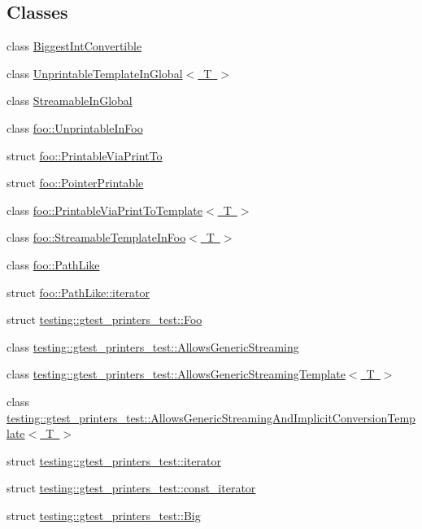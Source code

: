 \subsection*{Classes}
\begin{DoxyCompactItemize}
\item 
class \mbox{\hyperlink{class_biggest_int_convertible}{Biggest\+Int\+Convertible}}
\item 
class \mbox{\hyperlink{class_unprintable_template_in_global}{Unprintable\+Template\+In\+Global$<$ T $>$}}
\item 
class \mbox{\hyperlink{class_streamable_in_global}{Streamable\+In\+Global}}
\item 
class \mbox{\hyperlink{classfoo_1_1_unprintable_in_foo}{foo\+::\+Unprintable\+In\+Foo}}
\item 
struct \mbox{\hyperlink{structfoo_1_1_printable_via_print_to}{foo\+::\+Printable\+Via\+Print\+To}}
\item 
struct \mbox{\hyperlink{structfoo_1_1_pointer_printable}{foo\+::\+Pointer\+Printable}}
\item 
class \mbox{\hyperlink{classfoo_1_1_printable_via_print_to_template}{foo\+::\+Printable\+Via\+Print\+To\+Template$<$ T $>$}}
\item 
class \mbox{\hyperlink{classfoo_1_1_streamable_template_in_foo}{foo\+::\+Streamable\+Template\+In\+Foo$<$ T $>$}}
\item 
class \mbox{\hyperlink{classfoo_1_1_path_like}{foo\+::\+Path\+Like}}
\item 
struct \mbox{\hyperlink{structfoo_1_1_path_like_1_1iterator}{foo\+::\+Path\+Like\+::iterator}}
\item 
struct \mbox{\hyperlink{structtesting_1_1gtest__printers__test_1_1_foo}{testing\+::gtest\+\_\+printers\+\_\+test\+::\+Foo}}
\item 
class \mbox{\hyperlink{classtesting_1_1gtest__printers__test_1_1_allows_generic_streaming}{testing\+::gtest\+\_\+printers\+\_\+test\+::\+Allows\+Generic\+Streaming}}
\item 
class \mbox{\hyperlink{classtesting_1_1gtest__printers__test_1_1_allows_generic_streaming_template}{testing\+::gtest\+\_\+printers\+\_\+test\+::\+Allows\+Generic\+Streaming\+Template$<$ T $>$}}
\item 
class \mbox{\hyperlink{classtesting_1_1gtest__printers__test_1_1_allows_generic_streaming_and_implicit_conversion_template}{testing\+::gtest\+\_\+printers\+\_\+test\+::\+Allows\+Generic\+Streaming\+And\+Implicit\+Conversion\+Template$<$ T $>$}}
\item 
struct \mbox{\hyperlink{structtesting_1_1gtest__printers__test_1_1iterator}{testing\+::gtest\+\_\+printers\+\_\+test\+::iterator}}
\item 
struct \mbox{\hyperlink{structtesting_1_1gtest__printers__test_1_1const__iterator}{testing\+::gtest\+\_\+printers\+\_\+test\+::const\+\_\+iterator}}
\item 
struct \mbox{\hyperlink{structtesting_1_1gtest__printers__test_1_1_big}{testing\+::gtest\+\_\+printers\+\_\+test\+::\+Big}}
\end{DoxyCompactItemize}
